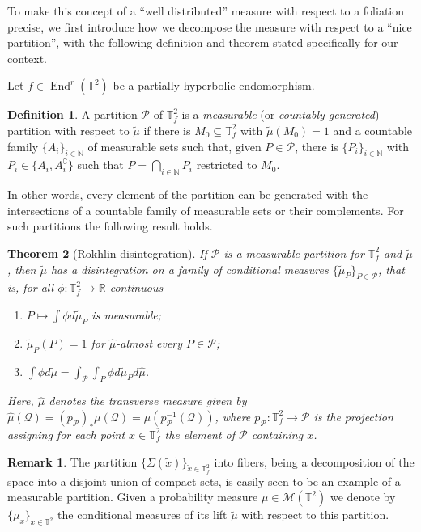\documentclass[a4paper,11pt,reqno]{amsart}
\newcommand{\R}{{\mathbb R}}
\newcommand{\N}{{\mathbb N}}
\newcommand{\TT}{{\mathbb{T}^2}}
\newcommand{\TTf}{{\mathbb{T}_f^2}}
\newcommand{\cM}{{\mathcal M}}
\newcommand{\tix}{\tilde{x}}
\newcommand{\tm}{\tilde{\mu}}
\newtheorem{theorem}{Theorem}[section]
\theoremstyle{definition}
\newtheorem{definition}[theorem]{Definition}
\newtheorem{remark}{Remark}
\begin{document}
To make this concept of a ``well distributed'' measure with respect to a foliation precise, we first introduce how we decompose the measure with respect to a ``nice partition'', with the following definition and theorem stated specifically for our context.

Let $f\in\operatorname{End}^r(\TT)$ be a partially hyperbolic endomorphism. 

\begin{definition}
    \label{def:measurable-part}
    A partition $\mathcal{P}$ of $\TTf$ is a \emph{measurable} (or \emph{countably generated}) partition with respect to $\tilde{\mu}$ if there is $M_0 \subseteq \TTf$ with $\tilde{\mu}(M_0) = 1$ and a countable family $\{A_i\}_{i \in \N}$ of measurable sets such that, given $P \in \mathcal{P}$, there is $\{P_i\}_{i \in \N}$ with $P_i \in \{A_i, A_i^\complement\}$ such that $P = \bigcap\limits_{i \in \N} P_i$ restricted to $M_0$.
\end{definition}

In other words, every element of the partition can be generated with the intersections of a countable family of measurable sets or their complements. For such partitions the following result holds.

\begin{theorem}[Rokhlin disintegration]
    If $\mathcal{P}$ is a measurable partition for $\TTf$ and $\tilde{\mu}$, then $\tilde{\mu}$ has a disintegration on a family of conditional measures $\{\tilde{\mu}_P\}_{P \in \mathcal{P}}$, that is, for all $\phi: \TTf \to \R$ continuous
    \begin{enumerate}
        \item $P \mapsto \int \phi d\tilde{\mu}_P$ is measurable;
        \item $\tilde{\mu}_P(P) = 1$ for $\hat{\mu}$-almost every $P \in \mathcal{P}$;
        \item $\int \phi d\tilde{\mu} = \int_\mathcal{P} \int_P \phi  d\tilde{\mu}_P d\hat{\mu} $.
    \end{enumerate}    Here, $\hat{\mu}$ denotes the \emph{transverse} measure given by $\hat{\mu}(\mathcal{Q}) = (p_{\mathcal{P}})_*\mu(\mathcal{Q}) = \mu(p_{\mathcal{P}}^{-1}(\mathcal{Q}))$, where $p_{\mathcal{P}}: \TTf \to \mathcal{P}$ is the projection assigning for each point $x \in\TTf$ the element of $\mathcal{P}$ containing $x$.
\end{theorem}

\begin{remark}
    \label{rem:desintegranafibra}
The partition $\{\Sigma(\tix)\}_{\tix\in\TTf}$ into fibers, being a decomposition of the space into a disjoint union of compact sets, is easily seen to be an example of a measurable partition. Given a probability measure $\mu\in\cM(\TT)$ we denote by $\{\mu_x\}_{x\in\TT}$ the conditional measures of its lift $\tm$  with respect to this partition.
\end{remark}
\end{document}
